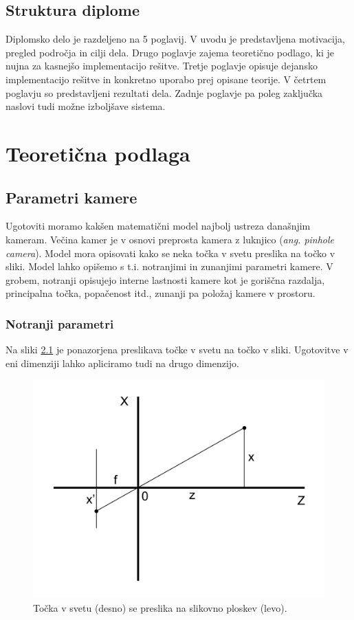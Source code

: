 \documentclass[a4paper, 12pt]{book}
\begin{document}
\section{Struktura diplome}
Diplomsko delo je razdeljeno na 5 poglavij. V uvodu je predstavljena motivacija, pregled področja in cilji dela. Drugo poglavje zajema teoretično podlago, ki je nujna za kasnejšo implementacijo rešitve. Tretje poglavje opisuje dejansko implementacijo rešitve in konkretno uporabo prej opisane teorije. V četrtem poglavju so predstavljeni rezultati dela. Zadnje poglavje pa poleg zaključka naslovi tudi možne izboljšave sistema.

\chapter{Teoretična podlaga}
\section{Parametri kamere}\label{parametri}
Ugotoviti moramo kakšen matematični model najbolj ustreza današnjim kameram. Večina kamer je v osnovi preprosta kamera z luknjico (\emph{ang. pinhole camera}). Model mora opisovati kako se neka točka v svetu preslika na točko v sliki. Model lahko opišemo s t.i. notranjimi in zunanjimi parametri kamere. V grobem, notranji opisujejo interne lastnosti kamere kot je goriščna razdalja, principalna točka, popačenost itd., zunanji pa položaj kamere v prostoru.

\subsection{Notranji parametri}
Na sliki \ref{similar1} je ponazorjena preslikava točke v svetu na točko v sliki. Ugotovitve v eni dimenziji lahko apliciramo tudi na drugo dimenzijo. 

\begin{figure}[H]
\centering
\includegraphics[width=\textwidth,height=\textheight,keepaspectratio]{similar_triangles_1.png}
\caption{Točka v svetu (desno) se preslika na slikovno ploskev (levo).}
\label{similar1}
\end{figure}
\end{document}
